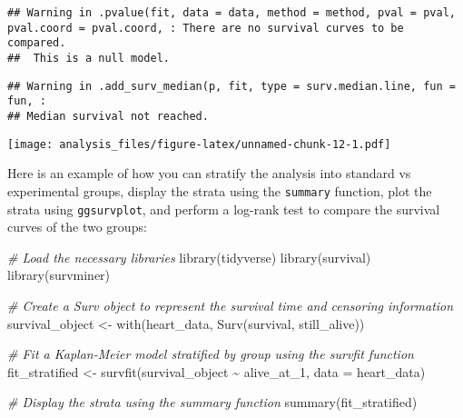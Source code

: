 \documentclass[
]{article}
\newenvironment{Shaded}{\begin{snugshade}}{\end{snugshade}}
\newcommand{\AttributeTok}[1]{\textcolor[rgb]{0.77,0.63,0.00}{#1}}
\newcommand{\CommentTok}[1]{\textcolor[rgb]{0.56,0.35,0.01}{\textit{#1}}}
\newcommand{\FunctionTok}[1]{\textcolor[rgb]{0.00,0.00,0.00}{#1}}
\newcommand{\NormalTok}[1]{#1}
\newcommand{\OtherTok}[1]{\textcolor[rgb]{0.56,0.35,0.01}{#1}}
\newcommand{\SpecialCharTok}[1]{\textcolor[rgb]{0.00,0.00,0.00}{#1}}
\begin{document}
\begin{verbatim}
## Warning in .pvalue(fit, data = data, method = method, pval = pval, pval.coord = pval.coord, : There are no survival curves to be compared. 
##  This is a null model.
\end{verbatim}

\begin{verbatim}
## Warning in .add_surv_median(p, fit, type = surv.median.line, fun = fun, :
## Median survival not reached.
\end{verbatim}

\texttt{[image: analysis\_files/figure-latex/unnamed-chunk-12-1.pdf]}

Here is an example of how you can stratify the analysis into standard vs
experimental groups, display the strata using the \texttt{summary}
function, plot the strata using \texttt{ggsurvplot}, and perform a
log-rank test to compare the survival curves of the two groups:

\begin{Shaded}
\begin{Highlighting}[]
\CommentTok{\# Load the necessary libraries}
\FunctionTok{library}\NormalTok{(tidyverse)}
\FunctionTok{library}\NormalTok{(survival)}
\FunctionTok{library}\NormalTok{(survminer)}

\CommentTok{\# Create a Surv object to represent the survival time and censoring information}
\NormalTok{survival\_object }\OtherTok{\textless{}{-}} \FunctionTok{with}\NormalTok{(heart\_data, }\FunctionTok{Surv}\NormalTok{(survival, still\_alive))}

\CommentTok{\# Fit a Kaplan{-}Meier model stratified by group using the survfit function}
\NormalTok{fit\_stratified }\OtherTok{\textless{}{-}} \FunctionTok{survfit}\NormalTok{(survival\_object }\SpecialCharTok{\textasciitilde{}}\NormalTok{ alive\_at\_1, }\AttributeTok{data =}\NormalTok{ heart\_data)}

\CommentTok{\# Display the strata using the summary function}
\FunctionTok{summary}\NormalTok{(fit\_stratified)}
\end{Highlighting}
\end{Shaded}
\end{document}
